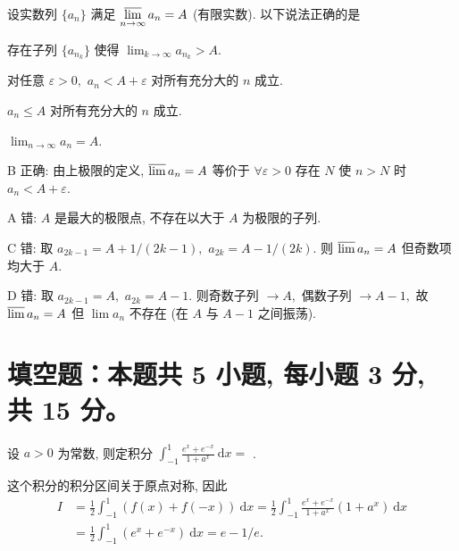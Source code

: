 \begin{question}
设实数列 $\{a_n\}$ 满足 $\displaystyle \varlimsup_{n\to\infty} a_n = A$ (有限实数). 以下说法正确的是 \paren[B]

\begin{choices}
\item 存在子列 $\{a_{n_k}\}$ 使得 $\lim_{k\to\infty} a_{n_k} > A.$
\item 对任意 $\varepsilon > 0,$ $a_n < A + \varepsilon$ 对所有充分大的 $n$ 成立.
\item $a_n \leqslant A$ 对所有充分大的 $n$ 成立.
\item $\lim_{n\to\infty} a_n = A.$
\end{choices}
\end{question}

\begin{solution}
B 正确: 由上极限的定义, $\varlimsup a_n = A$ 等价于 $\forall \varepsilon > 0$ 存在 $N$ 使 $n > N$ 时 $a_n < A + \varepsilon.$

A 错: $A$ 是最大的极限点, 不存在以大于 $A$ 为极限的子列.

C 错: 取 $a_{2k-1} = A + 1/(2k-1),$ $a_{2k} = A - 1/(2k).$ 则 $\varlimsup a_n = A$ 但奇数项均大于 $A.$

D 错: 取 $a_{2k-1} = A,$ $a_{2k} = A - 1.$ 则奇数子列 $\to A,$ 偶数子列 $\to A - 1,$ 故 $\varlimsup a_n = A$ 但 $\lim a_n$ 不存在 (在 $A$ 与 $A-1$ 之间振荡).
\end{solution}


\section{填空题：本题共 5 小题, 每小题 3 分, 共 15 分。}



\begin{question}
设 $a > 0$ 为常数, 则定积分 $\int_{-1}^1 \frac{e^x + e^{-x}}{1 + a^x} ~ \mathrm{d}x =$ \fillin[$e - 1/e$].
\end{question}

\begin{solution}
这个积分的积分区间关于原点对称, 因此
\begin{align*}
I & = \frac{1}{2} \int_{-1}^1 (f(x) + f(-x)) ~ \mathrm{d}x = \frac{1}{2} \int_{-1}^1 \frac{e^x + e^{-x}}{1 + a^x} (1 + a^x) ~ \mathrm{d}x \\
& = \frac{1}{2} \int_{-1}^1 (e^x + e^{-x}) ~ \mathrm{d}x = e - 1/e.
\end{align*}
\end{solution}

